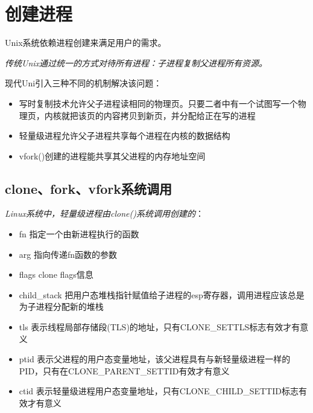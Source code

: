 \section{创建进程}

    Unix系统依赖进程创建来满足用户的需求。

    \emph{传统Unix通过统一的方式对待所有进程：子进程复制父进程所有资源。}

    现代Uni引入三种不同的机制解决该问题：

\begin{itemize}
    \item 写时复制技术允许父子进程读相同的物理页。只要二者中有一个试图写一个物理页，内核就把该页的内容拷贝到新页，并分配给正在写的进程
    \item 轻量级进程允许父子进程共享每个进程在内核的数据结构
    \item vfork()创建的进程能共享其父进程的内存地址空间
\end{itemize}

\subsection{clone、fork、vfork系统调用}

    \emph{Linux系统中，轻量级进程由clone()系统调用创建的}：

\begin{itemize}
    \item fn
    \subitem 指定一个由新进程执行的函数
    \item arg
    \subitem 指向传递fn函数的参数
    \item flags
    \subitem clone flags信息
    \item child\_stack
    \subitem 把用户态堆栈指针赋值给子进程的esp寄存器，调用进程应该总是为子进程分配新的堆栈
    \item tls
    \subitem 表示线程局部存储段(TLS)的地址，只有CLONE\_SETTLS标志有效才有意义
    \item ptid
    \subitem 表示父进程的用户态变量地址，该父进程具有与新轻量级进程一样的PID，只有在CLONE\_PARENT\_SETTID有效才有意义
    \item ctid
    \subitem 表示轻量级进程用户态变量地址，只有CLONE\_CHILD\_SETTID标志有效才有意义
\end{itemize}

